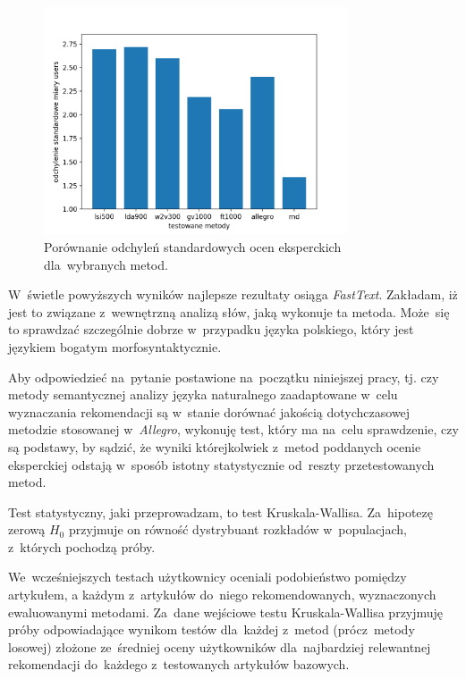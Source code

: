 \documentclass[pl]{minipw} %
\begin{document}
\begin{figure}[H]
	\centering
	\includegraphics[width=0.8\textwidth]{img/results/lsi500_lda900_w2v300_gv1000_ft1000_allegro_rnd_users_std.png}
	\caption{Porównanie odchyleń standardowych ocen eksperckich dla~wybranych metod.}
\end{figure}

W~świetle powyższych wyników najlepsze rezultaty osiąga \textit{FastText}. Zakładam, iż jest to związane z~wewnętrzną analizą słów, jaką wykonuje ta metoda. Może~się to sprawdzać szczególnie dobrze w~przypadku języka polskiego, który jest językiem bogatym morfosyntaktycznie.

Aby odpowiedzieć na~pytanie postawione na~początku niniejszej pracy, tj. czy metody semantycznej analizy języka naturalnego zaadaptowane w~celu wyznaczania rekomendacji są w~stanie dorównać jakością dotychczasowej metodzie stosowanej w~\textit{Allegro}, wykonuję test, który ma na~celu sprawdzenie, czy są podstawy, by sądzić, że wyniki którejkolwiek z~metod poddanych ocenie eksperckiej odstają w~sposób istotny statystycznie od~reszty przetestowanych metod.

Test statystyczny, jaki przeprowadzam, to test Kruskala-Wallisa. Za~hipotezę zerową $H_0$ przyjmuje on równość dystrybuant rozkładów w~populacjach, z~których pochodzą próby.

We~wcześniejszych testach użytkownicy oceniali podobieństwo pomiędzy artykułem, a każdym z~artykułów do~niego rekomendowanych, wyznaczonych ewaluowanymi metodami. Za~dane wejściowe testu Kruskala-Wallisa przyjmuję próby odpowiadające wynikom testów dla~każdej z~metod (prócz~metody losowej) złożone ze~średniej oceny użytkowników dla~najbardziej relewantnej rekomendacji do~każdego z~testowanych artykułów bazowych.
\end{document}
